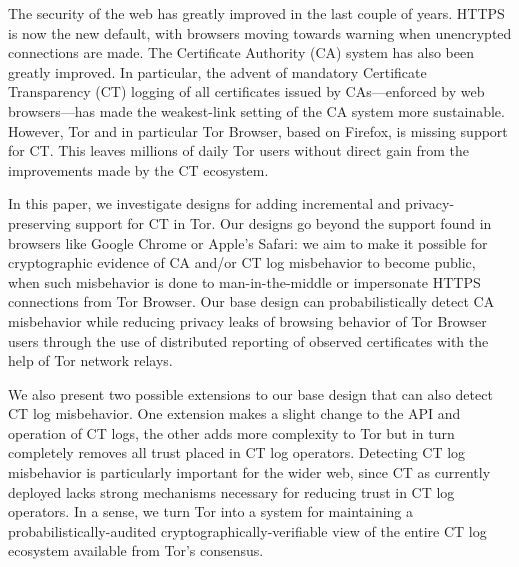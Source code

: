 The security of the web has greatly improved in the last couple of years. HTTPS
is now the new default, with browsers moving towards warning when unencrypted
connections are made. The Certificate Authority (CA) system has also been
greatly improved. In particular, the advent of mandatory Certificate
Transparency (CT) logging of all certificates issued by CAs---enforced by web
browsers---has made the weakest-link setting of the CA system more sustainable.
However, Tor and in particular Tor Browser, based on Firefox, is missing support
for CT. This leaves millions of daily Tor users without direct gain from the
improvements made by the CT ecosystem. 

In this paper, we investigate designs for adding incremental and
privacy-preserving support for CT in Tor. Our designs go beyond the support
found in browsers like Google Chrome or Apple's Safari: we aim to make it
possible for cryptographic evidence of CA and/or CT log misbehavior to become
public, when such misbehavior is done to man-in-the-middle or impersonate HTTPS
connections from Tor Browser. Our base design can probabilistically detect CA
misbehavior while reducing privacy leaks of browsing behavior of Tor Browser
users through the use of distributed reporting of observed certificates with the
help of Tor network relays.

We also present two possible extensions to our base design that can also detect
CT log misbehavior. One extension makes a slight change to the API and operation
of CT logs, the other adds more complexity to Tor but in turn completely removes
all trust placed in CT log operators. Detecting CT log misbehavior is
particularly important for the wider web, since CT as currently deployed lacks
strong mechanisms necessary for reducing trust in CT log operators. In a sense,
we turn Tor into a system for maintaining a probabilistically-audited
cryptographically-verifiable view of the entire CT log ecosystem available from
Tor’s consensus.